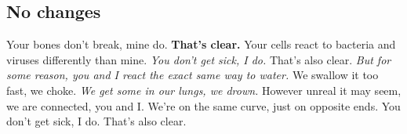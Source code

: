 \documentclass[11pt, a4paper, notitlepage, english]{article}
\begin{document}
\subsection*{No changes}

Your bones don't break, mine do.
\textbf{That's clear.}
Your cells react to bacteria and viruses differently than mine.
\textsl{You don't get sick, I do.}
That's also clear.
\textit{But for some reason, you and I react the exact same way to water.}
We swallow it too fast, we choke.
\emph{We get some in our lungs, we drown.}
However unreal it may seem, we are connected, you and I.
We're on the same curve, just on opposite ends.
You don't get sick, I do.
That's also clear.
\end{document}

